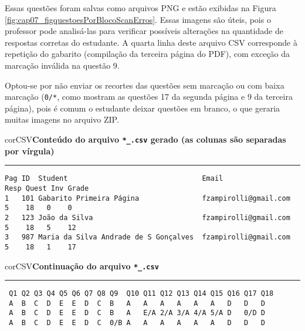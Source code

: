 Essas questões foram salvas como arquivos PNG e estão exibidas na Figura \ref{fig:cap07_figquestoesPorBlocoScanErros}. Essas imagens são úteis, pois o professor pode analisá-las para verificar possíveis alterações na quantidade de respostas corretas do estudante. A quarta linha deste arquivo CSV corresponde à repetição do gabarito (compilação da terceira página do PDF), com exceção da marcação inválida na questão 9. 

Optou-se por não enviar os recortes das questões sem marcação ou com baixa marcação (\verb|0/*|, como mostram as questões 17 da segunda página e 9 da terceira página), pois é comum o estudante deixar questões em branco, o que geraria muitas imagens no arquivo ZIP.

\begin{myboxCode}{corCSV}{\textbf{Conteúdo do arquivo \texttt{*\_.csv} gerado (as colunas são separadas por vírgula)}}\vspace{3mm}
\hrule
{\footnotesize
\begin{verbatim}
Pag ID  Student                                Email                  Resp Quest Inv Grade 
1   101 Gabarito Primeira Página               fzampirolli@gmail.com  5    18   0    0  
2   123 João da Silva                          fzampirolli@gmail.com  5    18   5    12  
3   987 Maria da Silva Andrade de S Gonçalves  fzampirolli@gmail.com  5    18   1    17  
\end{verbatim}
}
\end{myboxCode}

\begin{myboxCode}{corCSV}{\textbf{Continuação do arquivo \texttt{*\_.csv}}}\vspace{3mm}
  \hrule
  {\footnotesize
  \begin{verbatim}
 Q1 Q2 Q3 Q4 Q5 Q6 Q7 Q8 Q9  Q10 Q11 Q12 Q13 Q14 Q15 Q16 Q17 Q18
 A  B  C  D  E  E  D  C  B   A   A   A   A   A   A   D   D   D
 A  B  C  D  E  E  D  C  B   A   E/A 2/A 3/A 4/A 5/A D   0/D D
 A  B  C  D  E  E  D  C  0/B A   A   A   A   A   A   D   D   D
  \end{verbatim}
  }
  \end{myboxCode}




